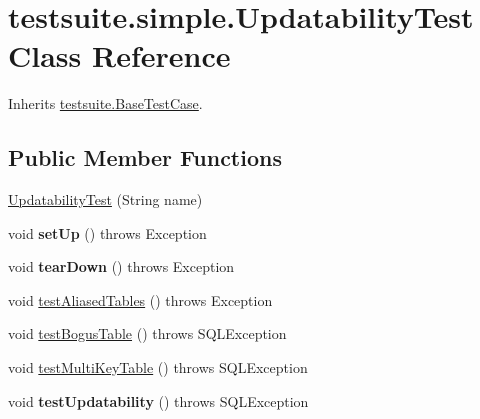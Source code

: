 \hypertarget{classtestsuite_1_1simple_1_1_updatability_test}{}\section{testsuite.\+simple.\+Updatability\+Test Class Reference}
\label{classtestsuite_1_1simple_1_1_updatability_test}


Inherits \mbox{\hyperlink{classtestsuite_1_1_base_test_case}{testsuite.\+Base\+Test\+Case}}.

\subsection*{Public Member Functions}
\begin{DoxyCompactItemize}
\item 
\mbox{\hyperlink{classtestsuite_1_1simple_1_1_updatability_test_a1ab7fd0482bf8c6fb2eec2e0bbc2be23}{Updatability\+Test}} (String name)
\item 
\mbox{\label{classtestsuite_1_1simple_1_1_updatability_test_ad7b2d9338b6097dd1b03e99015426f7d}} 
void {\bfseries set\+Up} ()  throws Exception 
\item 
\mbox{\label{classtestsuite_1_1simple_1_1_updatability_test_add9fa62db68ba414b064d6f89a0cfa6d}} 
void {\bfseries tear\+Down} ()  throws Exception 
\item 
void \mbox{\hyperlink{classtestsuite_1_1simple_1_1_updatability_test_a711d84fccc5379fc8389127a54893e15}{test\+Aliased\+Tables}} ()  throws Exception 
\item 
void \mbox{\hyperlink{classtestsuite_1_1simple_1_1_updatability_test_ac636788ee577887fe30ac0119eaba824}{test\+Bogus\+Table}} ()  throws S\+Q\+L\+Exception 
\item 
void \mbox{\hyperlink{classtestsuite_1_1simple_1_1_updatability_test_a689afecd2b1890b04a4c7b3a34fba460}{test\+Multi\+Key\+Table}} ()  throws S\+Q\+L\+Exception 
\item 
\mbox{\label{classtestsuite_1_1simple_1_1_updatability_test_ab12c72b9cf7dfb5229204bd6bb482c4c}} 
void {\bfseries test\+Updatability} ()  throws S\+Q\+L\+Exception 
\end{DoxyCompactItemize}
